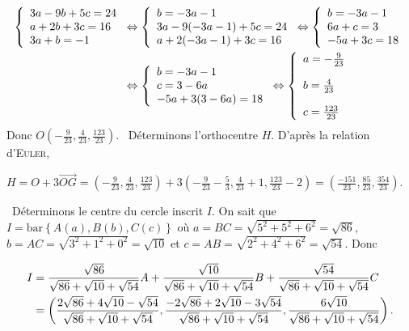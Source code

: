 \documentclass[11pt,a4paper]{article}
\begin{document}
\begin{align*}\ensuremath
\left\{
\begin{array}{l}
3a-9b+5c=24\\
a+2b+3c=16\\
3a+b=-1
\end{array}
\right.&\Leftrightarrow\left\{
\begin{array}{l}
b=-3a-1\\
3a-9(-3a-1)+5c=24\\
a+2(-3a-1)+3c=16
\end{array}
\right.\Leftrightarrow\left\{
\begin{array}{l}
b=-3a-1\\
6a+c=3\\
-5a+3c=18
\end{array}
\right.\\
 &\Leftrightarrow\left\{
\begin{array}{l}
b=-3a-1\\
c=3-6a\\
-5a+3(3-6a)=18
\end{array}
\right.
\Leftrightarrow\left\{
\begin{array}{l}
a=-\frac{9}{23}\\
b=\frac{4}{23}\rule{0mm}{7mm}\\
c=\frac{123}{23}\rule{0mm}{7mm}
\end{array}
\right.
\end{align*}
Donc $O\left(-\frac{9}{23},\frac{4}{23},\frac{123}{23}\right)$.
\textbullet~Déterminons l'orthocentre $H$. D'après la relation d'\textsc{Euler},

\begin{center}
$H=O+3\overrightarrow{OG}=\left(-\frac{9}{23},\frac{4}{23},\frac{123}{23}\right)+3\left(-\frac{9}{23}-\frac{5}{3},\frac{4}{23}+1,\frac{123}{23}-2\right)=\left(\frac{-151}{23},\frac{85}{23},\frac{354}{23}\right)$.
\end{center}
\textbullet~Déterminons le centre du cercle inscrit $I$. On sait que $I=\text{bar}\left\{A(a),B(b),C(c)\right\}$ où $a=BC=\sqrt{5^2+5^2+6^2}=\sqrt{86}$, $b=AC=\sqrt{3^2+1^2+0^2}=\sqrt{10}$ et $c=AB=\sqrt{2^2+4^2+6^2}=\sqrt{54}$. Donc

\begin{align*}\ensuremath
I&=\frac{\sqrt{86}}{\sqrt{86}+\sqrt{10}+\sqrt{54}}A
+\frac{\sqrt{10}}{\sqrt{86}+\sqrt{10}+\sqrt{54}}B+\frac{\sqrt{54}}{\sqrt{86}+\sqrt{10}+\sqrt{54}}C\\
 &=\left(
 \frac{2\sqrt{86}+4\sqrt{10}-\sqrt{54}}{\sqrt{86}+\sqrt{10}+\sqrt{54}},
 \frac{-2\sqrt{86}+2\sqrt{10}-3\sqrt{54}}{\sqrt{86}+\sqrt{10}+\sqrt{54}},
 \frac{6\sqrt{10}}{\sqrt{86}+\sqrt{10}+\sqrt{54}}
 \right).
\end{align*}
\end{document}
